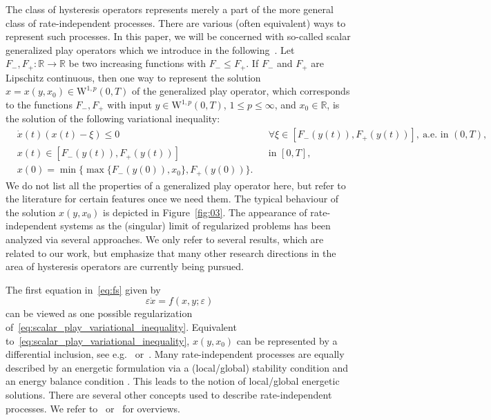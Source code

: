 \documentclass[12pt]{article}
\newcommand{\be}{\begin{equation}}
\newcommand{\ee}{\end{equation}}
\begin{document}
The class of hysteresis operators represents merely a part of the more general class 
of rate-independent processes. There are various (often equivalent) ways to represent 
such processes. In this paper, we will be concerned with so-called scalar generalized 
play operators which we introduce in the following~\cite[Chapter~III.2]{Visintin}. Let 
$F_-,F_+:\mathbb{R}\rightarrow\mathbb{R}$ be two increasing functions with $F_-\leq F_+$.
If $F_-$ and $F_+$ are Lipschitz continuous, then one way to represent the solution 
$x=x(y,x_0)\in \mathrm{W}^{1,p}(0,T)$ of the generalized play operator, which corresponds 
to the functions $F_-,F_+$ with input $y\in \mathrm{W}^{1,p}(0,T)$, $1\leq p \leq\infty$, 
and $x_0\in \mathbb{R}$, is the solution of the following variational inequality:
\begin{equation}
\begin{aligned}
&\dot{x}(t)(x(t)-\xi) \leq 0 && \forall\xi\in [F_-(y(t)), F_+(y(t))],\ 
\text{a.e. in } (0,T),\\
&x(t)\in [F_-(y(t)), F_+(y(t))] && \text{in }[0,T],\\
&x(0) = \min \{\max \{F_-(y(0)) , x_0\} ,F_+(y(0))\}.
\end{aligned}\label{eq:scalar_play_variational_inequality}
\end{equation}
We do not list all the properties of a generalized play operator here, but refer to the 
literature for certain features once we need them. The typical behaviour of the solution 
$x(y,x_0)$ is depicted in Figure~\ref{fig:03}. The appearance of rate-independent 
systems as the (singular) limit of regularized problems has been analyzed via 
several approaches. We only refer to several results, which are related to our work, 
but emphasize that many other research directions in
the area of hysteresis operators are currently being pursued.\medskip

The first equation in~\eqref{eq:fs} given by 
\be
\label{eq:justfast}
\varepsilon \dot{x} = f(x,y;\varepsilon)
\ee
can be viewed as one possible 
regularization of~\eqref{eq:scalar_play_variational_inequality}.
Equivalent to~\eqref{eq:scalar_play_variational_inequality}, $x(y,x_0)$ 
can be represented by a differential inclusion, see e.g.~\cite{Visintin} 
or~\cite{BrokateSprekels}. Many rate-independent processes are equally 
described by an energetic formulation via a (local/global) stability condition 
and an energy balance condition \cite[Chapter 2 or Chapter 3]{MielkeRoubicek}. 
This leads to the notion of local/global energetic solutions.
There are several other concepts used to describe rate-independent 
processes. We refer to~\cite{Mielke2} or~\cite{MielkeRossiSavare} for overviews.\medskip
\end{document}
